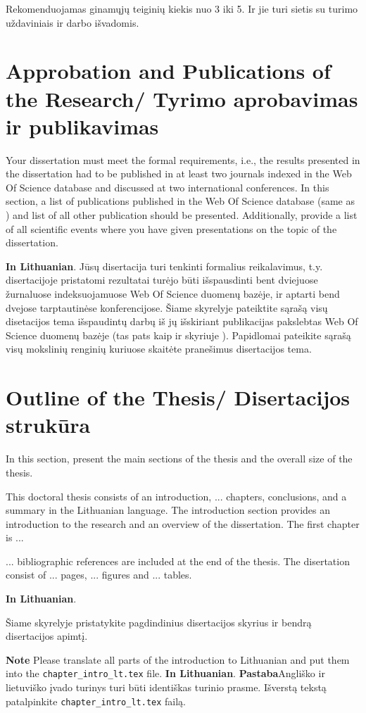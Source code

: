 Rekomenduojamas ginamųjų teiginių kiekis nuo  3 iki 5. Ir jie turi sietis su turimo uždaviniais ir darbo išvadomis.


\section*{Approbation and Publications of the Research/ Tyrimo aprobavimas ir publikavimas} %

Your dissertation must meet the formal requirements, i.e., the results presented in the dissertation had to be published in at least two journals indexed in the Web Of Science database and discussed at two international conferences.
In this section, a list of publications published in the Web Of Science database (same as ) and list of all other publication should be presented. Additionally, provide a list of all scientific events where you have given presentations on the topic of the dissertation.

\textbf{In Lithuanian}. 
Jūsų disertacija turi tenkinti formalius reikalavimus, t.y. disertacijoje pristatomi rezultatai turėjo būti išspausdinti bent dviejuose žurnaluose indeksuojamuose Web Of Science duomenų bazėje, ir aptarti bend dvejose tarptautinėse konferencijose.
Šiame skyrelyje pateiktite sąrašą visų disetacijos tema išspaudintų darbų iš jų išskiriant publikacijas pakslebtas Web Of Science duomenų bazėje (tas pats kaip ir skyriuje ). Papidlomai pateikite sąrašą visų mokslinių renginių kuriuose skaitėte pranešimus disertacijos tema.


\section*{Outline of the Thesis/ Disertacijos strukūra}

In this section, present the main sections of the thesis and the overall size of the thesis.

This doctoral thesis consists of an introduction, ... chapters, conclusions, and a summary in the Lithuanian language. The introduction section provides an introduction to the research and an overview of the dissertation. The first chapter is ...

... bibliographic references are included at the end of the thesis. The disertation consist of ... pages, ... figures and ... tables.


\textbf{In Lithuanian}. 

Šiame skyrelyje pristatykite pagdindinius disertacijos skyrius ir bendrą disertacijos apimtį.



\textbf{Note} Please translate all parts of the introduction to Lithuanian and put them into the \verb|chapter_intro_lt.tex| file.
\textbf{In Lithuanian}. \textbf{Pastaba}Angliško ir lietuviško įvado turinys turi būti identiškas turinio prasme. Išverstą tekstą patalpinkite \verb|chapter_intro_lt.tex| failą.